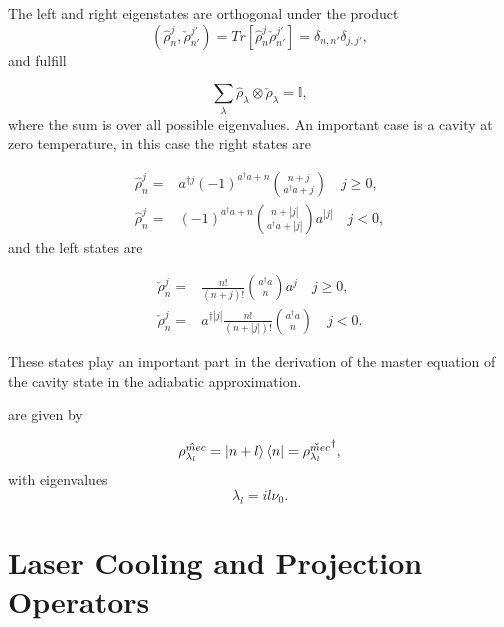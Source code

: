 \documentclass[reprint, amsmath,amssymb, aps,pra]{revtex4-1}
\begin{document}
The left and right eigenstates are orthogonal under the product
\begin{equation}
(\hat{\rho}_n^j,\check{\rho}_{n'}^{j'})=Tr[\hat{\rho}_n^j\check{\rho}_{n'}^{j'}] = \delta_{n,n'}\delta_{j,j'},
\end{equation} and fulfill

\begin{equation}\label{DampingBasisCompleteness}
\sum_{\lambda} \hat{\rho}_\lambda \otimes \check{\rho}_\lambda = \mathbb{I},
\end{equation} where the sum is over all possible eigenvalues. An important case is a cavity at zero temperature, in this case the right states are \cite{EnglertDB}

\begin{align}\label{DefDBZero}
\hat{\rho}_n^j=&a^{\dagger j}(-1)^{a^\dagger a + n}\binom{n+j}{a^\dagger a+j} \quad j \geq 0, \\
\hat{\rho}_n^j=&(-1)^{a^\dagger a + n}\binom{n+|j|}{a^\dagger a+|j|}a^{|j|} \quad j < 0,
\end{align} and the left states are

\begin{align}\label{DefDBDualZero}
\check{\rho}_n^j=&\frac{n!}{(n+j)!}\binom{a^\dagger a}{n}a^j \quad j \geq 0, \\
\check{\rho}_n^j=&a^{\dagger|j|}\frac{n!}{(n+|j|)!}\binom{a^\dagger a}{n} \quad j < 0.
\end{align}

These states play an important part in the derivation of the master
equation of the cavity state in the adiabatic approximation.


are given by

\begin{equation}
\hat{\rho_{\lambda_l}^{mec}}=\Ket{n+l}\Bra{n}=\check{\rho_{\lambda_l}^{mec}}^\dagger,
\end{equation} 
with eigenvalues
\begin{equation}
\lambda_l = i l \nu_0.
\end{equation}

\section{Laser Cooling and Projection Operators}\label{CoolingAppendix}
\end{document}
